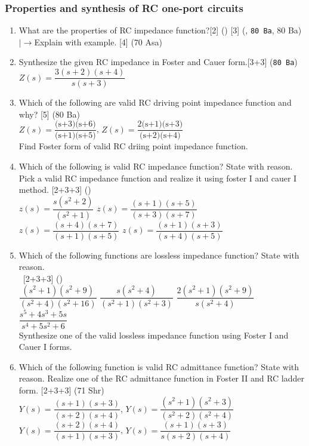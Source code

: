\documentclass[12pt]{article}
\newcommand{\lb}{\\$\left|\rightarrow\right.$}
\newcommand{\enter}{\\\textcolor{white}{1}}
\begin{document}
\subsubsection{Properties and synthesis of RC one-port circuits}
\begin{enumerate}
	\item What are the properties of RC impedance function?\hfill [2] () [3] (, \texttt{80 Ba}, 80 Ba)
	\lb Explain with example. \hfill [4] (70 Asa)
	
	\item Synthesize the given RC impedance in Foster and Cauer form.\hfill[3+3] (\texttt{80 Ba})\\
$Z(s) = \dfrac{3(s+2)(s+4)}{s(s+3)}$
	
	\item Which of the following are valid RC driving point impedance function and why? \hfill [5] (80 Ba)\\
	$Z(s) = \dfrac{\text{(s+3)(s+6)}}{\text{(s+1)(s+5)}}$, \hspace{1cm} $Z(s) = \dfrac{\text{2(s+1)(s+3)}}{\text{(s+2)(s+4)}}$\\
	Find Foster form of valid RC driing point impedance function.
	
	\item Which of the following is valid RC impedance function? State with reason. Pick a valid RC impedance function and realize it using foster I and cauer I method. \hfill [2+3+3] ()\\
	$z(s) = \dfrac{s(s^2+2)}{(s^2+1)}$ \hspace{2.8cm}
	$z(s) = \dfrac{(s+1)(s+5)}{(s+3)(s+7)}$ \\
	$z(s) = \dfrac{(s+4)(s+7)}{(s+1)(s+5)}$ \hspace{2cm}
	$z(s) = \dfrac{(s+1)(s+3)}{(s+4)(s+5)}$ 
	
	\item Which of the following functions are lossless impedance function? State with reason. 
	\enter\hfill [2+3+3] ()\\
	$\dfrac{(s^2+1)(s^2+9)}{(s^2+4)(s^2+16)}$ \hspace{1cm}
	$\dfrac{s(s^2+4)}{(s^2+1)(s^2+3)}$ \hspace{1cm}
	$\dfrac{2(s^2+1)(s^2+9)}{s(s^2+4)}$ \hspace{1cm}
	$\dfrac{s^5+4s^3+5s}{s^4+5s^2+6}$\\
	Synthesize one of the valid lossless impedance function using Foster I and Cauer I forms.	
	
	\item Which of the following function is valid RC admittance function? State with reason. Realize one of the RC admittance function in Foster II and RC ladder form. \hfill [2+3+3] (71 Shr)\\
	$Y(s) = \dfrac{(s+1)(s+3)}{(s+2)(s+4)}$, \hspace{2cm}
	$Y(s) = \dfrac{(s^2+1)(s^2+3)}{(s^2+2)(s^2+4)}$\\
	$Y(s) = \dfrac{(s+2)(s+4)}{(s+1)(s+3)}$, \hspace{2cm}
	$Y(s) = \dfrac{(s+1)(s+3)}{s(s+2)(s+4)}$
\end{enumerate}
\end{document}
